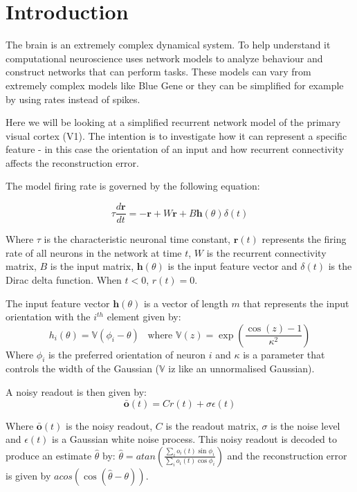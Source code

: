 \documentclass[a4paper, 11pt, oneside]{report}
\begin{document}
\section*{Introduction}

The brain is an extremely complex dynamical system.
To help understand it computational neuroscience uses network models to analyze
behaviour and construct networks that can perform tasks.
These models can vary from extremely complex models like Blue Gene
or they can be simplified for example by using rates instead of spikes.

Here we will be looking at a simplified recurrent network model of the 
primary visual cortex (V1). The intention is to investigate how 
it can represent a specific feature - in this case the orientation of an input
and how recurrent connectivity affects the reconstruction error.

The model firing rate is governed by the following equation:

\def\r{\mathbf{r}}
\def\h{\mathbf{h}}
\begin{equation}
    \tau \frac{d \r}{dt} = -\r + W\r + B\h(\theta)\delta(t)
\end{equation}

Where $\tau$ is the characteristic neuronal time constant, $\r(t)$
represents the firing rate of all neurons in the network at time $t$,
$W$ is the recurrent connectivity matrix, $B$ is the input
matrix, $\h(\theta)$ is the input feature vector and $\delta(t)$ is the Dirac delta function.
When $t<0$, $r(t)=0$.

The input feature vector $\h(\theta)$ is a vector of length $m$ that represents the input
orientation with the $i^{th}$ element given by:
\begin{equation}
    h_i(\theta) = \mathbb{V}(\phi_i - \theta) \,\,\, \text{ where } \mathbb{V}(z) = \exp\left(\frac{\cos(z)-1}{\kappa^2}\right)
\end{equation}
Where $\phi_i$ is the preferred orientation of neuron $i$ and $\kappa$ is a parameter that controls the width of the Gaussian
($\mathbb{V}$ iz like an unnormalised Gaussian).

A noisy readout is then given by:
\begin{equation}
    \bar{\mathbf{o}}(t) = Cr(t) + \sigma \epsilon(t)
\end{equation}

Where $\bar{\mathbf{o}}(t)$ is the noisy readout, $C$ is the readout matrix, $\sigma$ is the noise level and $\epsilon(t)$ is a Gaussian white noise process.
This noisy readout is decoded to produce an estimate $\hat{\theta}$ by: $\hat{\theta} = atan\left(\frac{\sum_i o_i(t)\sin\phi_i}{\sum_i o_i(t)\cos\phi_i}\right)$
and the reconstruction error is given by $acos(\cos(\hat{\theta}-\theta))$.
\end{document}
